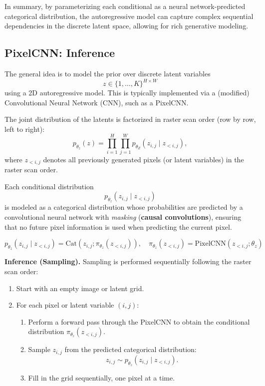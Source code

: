 In summary, by parameterizing each conditional as a neural network-predicted categorical distribution, the autoregressive model can capture complex sequential dependencies in the discrete latent space, allowing for rich generative modeling.

\subsection{PixelCNN: Inference}
The general idea is to model the prior over discrete latent variables 
\[
z \in \{1, \dots, K\}^{H \times W}
\] 
using a 2D autoregressive model. This is typically implemented via a (modified) Convolutional Neural Network (CNN), such as a PixelCNN.  

The joint distribution of the latents is factorized in raster scan order (row by row, left to right):
\[
p_{\theta_z}(z) = \prod_{i=1}^{H} \prod_{j=1}^{W} p_{\theta_Z}(z_{i,j} \mid z_{<i,j}),
\]
where \(z_{<i,j}\) denotes all previously generated pixels (or latent variables) in the raster scan order.  


Each conditional distribution 
\[
p_{\theta_z}(z_{i,j} \mid z_{<i,j})
\] 
is modeled as a categorical distribution whose probabilities are predicted by a convolutional neural network with \emph{masking} (\textbf{causal convolutions}), ensuring that no future pixel information is used when predicting the current pixel.

\[
p_{\theta_z}(z_{i,j} \mid z_{<i,j}) = \mathrm{Cat}(z_{i,j}; \pi_{\theta_z}(z_{<i,j})), 
\quad \pi_{\theta_z}(z_{<i,j}) = \mathrm{PixelCNN}(z_{<i,j}; \theta_z)
\]

\textbf{Inference (Sampling).}  
Sampling is performed sequentially following the raster scan order:

\begin{enumerate}
    \item Start with an empty image or latent grid.  
    \item For each pixel or latent variable \((i,j)\):
    \begin{enumerate}
        \item Perform a forward pass through the PixelCNN to obtain the conditional distribution \(\pi_{\theta_z}(z_{<i,j})\).  
        \item Sample \(z_{i,j}\) from the predicted categorical distribution:
        \[
        z_{i,j} \sim p_{\theta_z}(z_{i,j} \mid z_{<i,j}).
        \]  
        \item Fill in the grid sequentially, one pixel at a time.
    \end{enumerate}
\end{enumerate}

